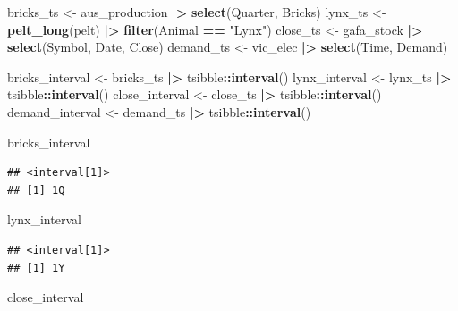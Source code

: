 \documentclass[
  11pt,
]{article}
\newenvironment{Shaded}{\begin{snugshade}}{\end{snugshade}}
\newcommand{\FunctionTok}[1]{\textcolor[rgb]{0.13,0.29,0.53}{\textbf{#1}}}
\newcommand{\NormalTok}[1]{#1}
\newcommand{\OtherTok}[1]{\textcolor[rgb]{0.56,0.35,0.01}{#1}}
\newcommand{\SpecialCharTok}[1]{\textcolor[rgb]{0.81,0.36,0.00}{\textbf{#1}}}
\newcommand{\StringTok}[1]{\textcolor[rgb]{0.31,0.60,0.02}{#1}}
\begin{document}
\begin{Shaded}
\begin{Highlighting}[]
\NormalTok{bricks\_ts }\OtherTok{\textless{}{-}}\NormalTok{ aus\_production }\SpecialCharTok{|\textgreater{}} \FunctionTok{select}\NormalTok{(Quarter, Bricks)}
\NormalTok{lynx\_ts }\OtherTok{\textless{}{-}} \FunctionTok{pelt\_long}\NormalTok{(pelt) }\SpecialCharTok{|\textgreater{}} \FunctionTok{filter}\NormalTok{(Animal }\SpecialCharTok{==} \StringTok{"Lynx"}\NormalTok{)}
\NormalTok{close\_ts  }\OtherTok{\textless{}{-}}\NormalTok{ gafa\_stock }\SpecialCharTok{|\textgreater{}} \FunctionTok{select}\NormalTok{(Symbol, Date, Close)}
\NormalTok{demand\_ts }\OtherTok{\textless{}{-}}\NormalTok{ vic\_elec }\SpecialCharTok{|\textgreater{}} \FunctionTok{select}\NormalTok{(Time, Demand)}

\NormalTok{bricks\_interval }\OtherTok{\textless{}{-}}\NormalTok{ bricks\_ts }\SpecialCharTok{|\textgreater{}}\NormalTok{ tsibble}\SpecialCharTok{::}\FunctionTok{interval}\NormalTok{()}
\NormalTok{lynx\_interval   }\OtherTok{\textless{}{-}}\NormalTok{ lynx\_ts   }\SpecialCharTok{|\textgreater{}}\NormalTok{ tsibble}\SpecialCharTok{::}\FunctionTok{interval}\NormalTok{()}
\NormalTok{close\_interval  }\OtherTok{\textless{}{-}}\NormalTok{ close\_ts  }\SpecialCharTok{|\textgreater{}}\NormalTok{ tsibble}\SpecialCharTok{::}\FunctionTok{interval}\NormalTok{()}
\NormalTok{demand\_interval }\OtherTok{\textless{}{-}}\NormalTok{ demand\_ts }\SpecialCharTok{|\textgreater{}}\NormalTok{ tsibble}\SpecialCharTok{::}\FunctionTok{interval}\NormalTok{()}

\NormalTok{bricks\_interval}
\end{Highlighting}
\end{Shaded}

\begin{verbatim}
## <interval[1]>
## [1] 1Q
\end{verbatim}

\begin{Shaded}
\begin{Highlighting}[]
\NormalTok{lynx\_interval}
\end{Highlighting}
\end{Shaded}

\begin{verbatim}
## <interval[1]>
## [1] 1Y
\end{verbatim}

\begin{Shaded}
\begin{Highlighting}[]
\NormalTok{close\_interval}
\end{Highlighting}
\end{Shaded}
\end{document}
